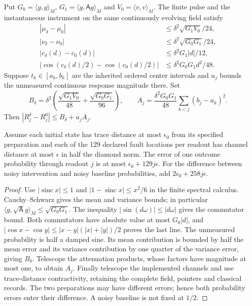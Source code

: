 \begin{proposition}
\label{prop:source-scalar-finite-noise}
Put $G_0=\langle g,g\rangle_M$, $G_1=\langle g,\mathsf A g\rangle_M$
and $V_0=\langle v,v\rangle_M$. The finite pulse and the instantaneous
instrument on the same continuously evolving field satisfy
\begin{align*}
 |\mu_\delta-\mu_0|&\le\delta^2\sqrt{G_1V_0}/24,\\
 |\nu_\delta-\nu_0|&\le\delta^2\sqrt{G_0G_1}/24,\\
 |c_\delta(d)-c_0(d)|&\le\delta^2G_1|d|/12,\\
 |\cos(c_\delta(d)/2)-\cos(c_0(d)/2)|
 &\le\delta^2G_0G_1d^2/48.
\end{align*}
Suppose $t_k\in[a_k,b_k]$ are the inherited ordered center intervals and
$u_j$ bounds the unmeasured continuous response magnitude there. Set
\[
 B_\delta=\delta^2\left(\frac{\sqrt{G_1V_0}}{48}
                  +\frac{\sqrt{G_0G_1}}{96}\right),\qquad
 A_j=\frac{\delta^2G_0G_1}{48}\sum_{k<j}(b_j-a_k)^2.
\]
Then $|R_j^\delta-R_j^0|\le B_\delta+u_jA_j$.

Assume each initial state has trace distance at most $\epsilon_0$ from its
specified preparation and each of the 129 declared fault locations per
readout has channel distance at most $\epsilon$ in half the diamond norm.
The error of one outcome probability through readout $j$ is at most
$\epsilon_0+129j\epsilon$. For the difference between noisy intervention
and noisy baseline probabilities, add $2\epsilon_0+258j\epsilon$.
\end{proposition}
\begin{proof}
Use $|\operatorname{sinc}x|\le1$ and
$|1-\operatorname{sinc}x|\le x^2/6$ in the finite spectral calculus.
Cauchy--Schwarz gives the mean and variance bounds; in particular
$\langle g,\sqrt{\mathsf A}g\rangle_M\le\sqrt{G_0G_1}$.
The inequality $|\sin(d\omega)|\le|d\omega|$ gives the commutator bound.
Both commutators have absolute value at most $G_0|d|$, and
$|\cos x-\cos y|\le|x-y|(|x|+|y|)/2$ proves the last line.
The unmeasured probability is half a damped sine. Its mean contribution is
bounded by half the mean error and its variance contribution by one quarter
of the variance error, giving $B_\delta$. Telescope the attenuation
products, whose factors have magnitude at most one, to obtain $A_j$.
Finally telescope the implemented channels and use trace-distance
contractivity, retaining the complete field, pointers and classical records.
The two preparations may have different errors; hence both probability
errors enter their difference. A noisy baseline is not fixed at $1/2$.
\end{proof}

